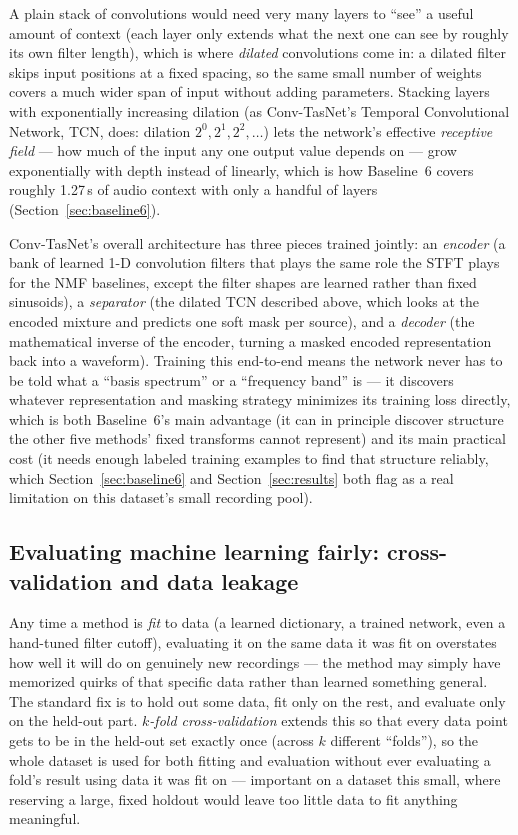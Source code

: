 \documentclass[11pt]{article}
\begin{document}
A plain stack of convolutions would need very many layers to ``see'' a
useful amount of context (each layer only extends what the next one can
see by roughly its own filter length), which is where \emph{dilated}
convolutions come in: a dilated filter skips input positions at a fixed
spacing, so the same small number of weights covers a much wider span of
input without adding parameters. Stacking layers with exponentially
increasing dilation (as Conv-TasNet's Temporal Convolutional Network, TCN,
does: dilation $2^0, 2^1, 2^2,\dots$) lets the network's effective
\emph{receptive field} --- how much of the input any one output value
depends on --- grow exponentially with depth instead of linearly, which is
how Baseline~6 covers roughly 1.27\,s of audio context with only a
handful of layers (Section~\ref{sec:baseline6}).

Conv-TasNet's overall architecture has three pieces trained jointly:
an \emph{encoder} (a bank of learned 1-D convolution filters that plays the
same role the STFT plays for the NMF baselines, except the filter shapes
are learned rather than fixed sinusoids), a \emph{separator} (the dilated
TCN described above, which looks at the encoded mixture and predicts one
soft mask per source), and a \emph{decoder} (the mathematical inverse of
the encoder, turning a masked encoded representation back into a
waveform). Training this end-to-end means the network never has to be told
what a ``basis spectrum'' or a ``frequency band'' is --- it discovers
whatever representation and masking strategy minimizes its training loss
directly, which is both Baseline~6's main advantage (it can in principle
discover structure the other five methods' fixed transforms cannot
represent) and its main practical cost (it needs enough labeled training
examples to find that structure reliably, which Section~\ref{sec:baseline6}
and Section~\ref{sec:results} both flag as a real limitation on this
dataset's small recording pool).

\subsection{Evaluating machine learning fairly: cross-validation and data leakage}
\label{sec:bg-cv}

Any time a method is \emph{fit} to data (a learned dictionary, a trained
network, even a hand-tuned filter cutoff), evaluating it on the same data
it was fit on overstates how well it will do on genuinely new recordings
--- the method may simply have memorized quirks of that specific data
rather than learned something general. The standard fix is to hold out
some data, fit only on the rest, and evaluate only on the held-out part.
\emph{$k$-fold cross-validation} extends this so that every data point
gets to be in the held-out set exactly once (across $k$ different
``folds''), so the whole dataset is used for both fitting and evaluation
without ever evaluating a fold's result using data it was fit on ---
important on a dataset this small, where reserving a large, fixed holdout
would leave too little data to fit anything meaningful.
\end{document}
